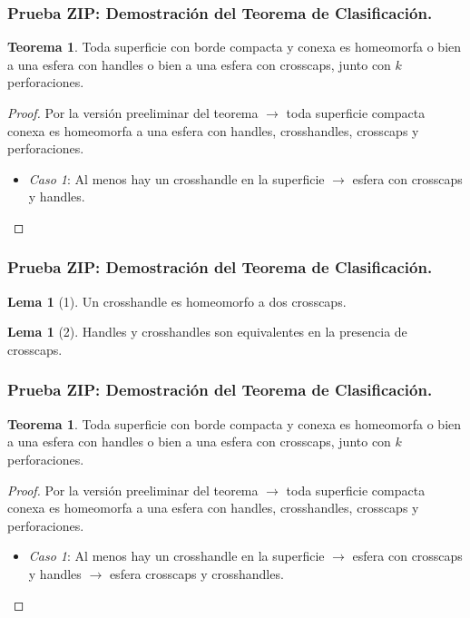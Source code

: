 \documentclass{beamer}
\theoremstyle{definition}
\newtheorem{tma}[defin]{Teorema}
\newtheorem{lema}[defin]{Lema}
\begin{document}
\begin{frame}
\frametitle{Prueba ZIP: Demostración del Teorema de Clasificación.}
\begin{tma}
Toda superficie con borde compacta y conexa es homeomorfa o bien a una esfera con handles o bien a una esfera con crosscaps, junto con $k$ perforaciones.
\end{tma}
\begin{proof}
Por la versión preeliminar del teorema $\longrightarrow$ toda superficie compacta conexa es homeomorfa a una esfera con handles, crosshandles, crosscaps y perforaciones.

\begin{itemize}
\item \textit{Caso 1}: Al menos hay un crosshandle en la superficie $\rightarrow$ esfera con crosscaps y handles.
\end{itemize}
\end{proof}
\end{frame}

\begin{frame}
\frametitle{Prueba ZIP: Demostración del Teorema de Clasificación.}
\begin{lema} [1]
Un crosshandle es homeomorfo a dos crosscaps.
\end{lema}

\begin{lema}[2]
Handles y crosshandles son equivalentes en la presencia de crosscaps.
\end{lema}
\end{frame}



\begin{frame}
\frametitle{Prueba ZIP: Demostración del Teorema de Clasificación.}
\begin{tma}
Toda superficie con borde compacta y conexa es homeomorfa o bien a una esfera con handles o bien a una esfera con crosscaps, junto con $k$ perforaciones.
\end{tma}
\begin{proof}
Por la versión preeliminar del teorema $\longrightarrow$ toda superficie compacta conexa es homeomorfa a una esfera con handles, crosshandles, crosscaps y perforaciones.

\begin{itemize}
\item \textit{Caso 1}: Al menos hay un crosshandle en la superficie $\rightarrow$ esfera con crosscaps y handles $\rightarrow$ esfera crosscaps y crosshandles.
\end{itemize}
\end{proof}
\end{frame}
\end{document}
